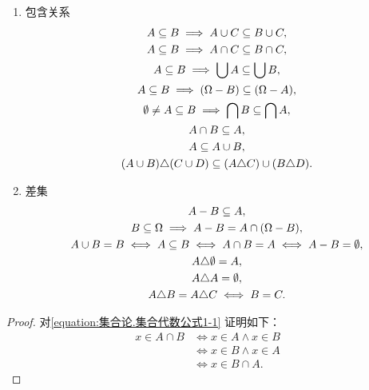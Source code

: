 \begin{property}
\begin{enumerate}
\item 包含关系
\begin{gather}
	A \subseteq B \implies A \cup C \subseteq B \cup C, \label{equation:集合论.集合代数公式6-1} \\
	A \subseteq B \implies A \cap C \subseteq B \cap C, \label{equation:集合论.集合代数公式6-2} \\
	A \subseteq B \implies \bigcup A \subseteq \bigcup B, \label{equation:集合论.集合代数公式6-3} \\
	A \subseteq B \implies (\Omega - B) \subseteq (\Omega - A), \label{equation:集合论.集合代数公式6-4} \\
	\emptyset \neq A \subseteq B \implies \bigcap B \subseteq \bigcap A, \label{equation:集合论.集合代数公式6-5} \\
	A \cap B \subseteq A, \\
	A \subseteq A \cup B, \\
	(A \cup B) \triangle (C \cup D) \subseteq (A \triangle C) \cup (B \triangle D).
\end{gather}

\item 差集
\begin{gather}
	A - B \subseteq A, \\
	B \subseteq \Omega
	\implies
	A - B = A \cap (\Omega - B), \\
	A \cup B = B
		\iff A \subseteq B
		\iff A \cap B = A
		\iff A - B = \emptyset, \label{equation:集合论.集合代数公式7-3} \\
	A \triangle \emptyset = A, \\
	A \triangle A = \emptyset, \\
	A \triangle B = A \triangle C
		\iff B = C.
\end{gather}
\end{enumerate}
\begin{proof}
对\cref{equation:集合论.集合代数公式1-1} 证明如下：
\begin{align*}
	x \in A \cap B
	&\iff x \in A \land x \in B \\
	&\iff x \in B \land x \in A \\
	&\iff x \in B \cap A.
\end{align*}


\end{proof}
\end{property}
